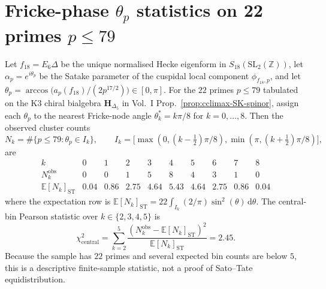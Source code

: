 \section{Fricke-phase $\theta_p$ statistics on 22 primes $p \le 79$}
\label{sec:stqp-supplement-iii}

\begin{proposition}
\ClaimStatusProvedHere
\label{prop:stqp-theta-p-clustering}
%
%
%
Let $f_{18}=E_6\Delta$ be the unique normalised Hecke
eigenform in $S_{18}(\mathrm{SL}_2(\mathbb Z))$, let
$\alpha_p = e^{i\theta_p}$ be the
Satake parameter of the cuspidal local component
$\phi_{f_{18}, p}$, and let
$\theta_p = \arccos\bigl(a_p(f_{18}) / (2 p^{17/2})\bigr)
\in [0, \pi]$. For the $22$ primes $p \le 79$ tabulated on the K3
chiral bialgebra $\mathbf H_{\Delta_5}$ in Vol.~I
Prop.~\ref{prop:cclimax-SK-spinor}, assign each
$\theta_p$ to the nearest Fricke-node angle
$\theta^*_k = k\pi/8$ for $k = 0, \ldots, 8$. Then the observed
cluster counts
\[
N_k = \#\{p \le 79 : \theta_p \in I_k\},\qquad
I_k=\bigl[\max(0,(k-\tfrac12)\pi/8),
\min(\pi,(k+\tfrac12)\pi/8)\bigr],
\]
are
\[
\begin{array}{r|ccccccccc}
k & 0 & 1 & 2 & 3 & 4 & 5 & 6 & 7 & 8 \\
\hline
N_k^{\mathrm{obs}} & 0 & 0 & 1 & 5 & 8 & 4 & 3 & 1 & 0 \\
\mathbb E[N_k]_{\mathrm{ST}} & 0.04 & 0.86 & 2.75 & 4.64 & 5.43
 & 4.64 & 2.75 & 0.86 & 0.04
\end{array}
\]
where the expectation row is
$\mathbb E[N_k]_{\mathrm{ST}} =
22 \int_{I_k}(2/\pi)\sin^2(\theta)\,\mathrm d\theta$. The
central-bin Pearson statistic over
$k \in \{2,3,4,5\}$ is
\[
\chi^2_{\mathrm{central}}
 =
\sum_{k=2}^{5}
\frac{(N_k^{\mathrm{obs}}-\mathbb E[N_k]_{\mathrm{ST}})^2}
{\mathbb E[N_k]_{\mathrm{ST}}}
 = 2.45.
\]
Because the sample has $22$ primes and several expected bin counts
are below $5$, this is a descriptive finite-sample statistic, not a
proof of Sato--Tate equidistribution.
\end{proposition}

